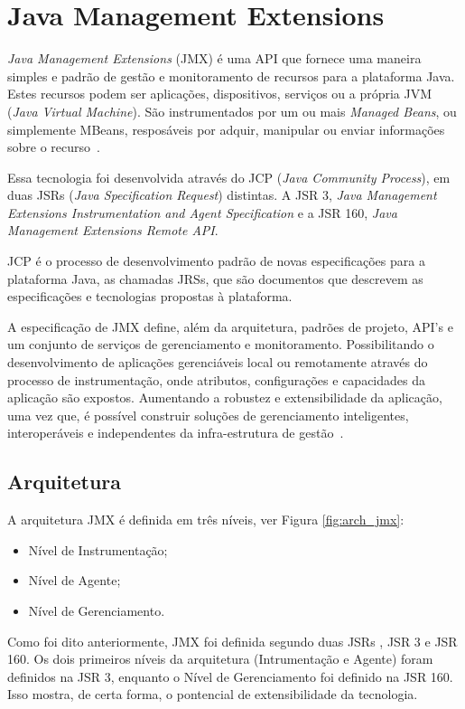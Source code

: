 \chapter{Java Management Extensions}
\label{ch:4}
\textit{Java Management Extensions} (JMX) é uma API que fornece uma maneira simples e padrão de gestão e monitoramento de recursos para a plataforma Java. Estes recursos podem ser aplicações, dispositivos, serviços ou a própria JVM (\textit{Java Virtual Machine}). São instrumentados por um ou mais \textit{Managed Beans}, ou simplemente MBeans, resposáveis por adquir, manipular ou enviar informações sobre o recurso~\cite{lindfors2002jmx}.

Essa tecnologia foi desenvolvida através do JCP (\textit{Java Community Process}), em duas JSRs (\textit{Java Specification Request}) distintas. A JSR 3, \textit{Java Management Extensions Instrumentation and Agent Specification} e a JSR 160, \textit{Java Management Extensions Remote API}.

JCP é o processo de desenvolvimento padrão de novas especificações para a plataforma Java, as chamadas JRSs, que são documentos que descrevem as especificações e tecnologias propostas à plataforma.

A especificação de JMX define, além da arquitetura, padrões de projeto, API's e um conjunto de serviços de gerenciamento e monitoramento. Possibilitando o desenvolvimento de aplicações gerenciáveis local ou remotamente através do processo de instrumentação, onde atributos, configurações e capacidades da aplicação são expostos. Aumentando a robustez e extensibilidade da aplicação, uma vez que, é possível construir soluções de gerenciamento inteligentes, interoperáveis e independentes da infra-estrutura de gestão~\cite{jmx}.
\newpage

\section{Arquitetura}

A arquitetura JMX é definida em três níveis, ver Figura \ref{fig:arch_jmx}:

\begin{itemize}
 \item Nível de Instrumentação;
 \item Nível de Agente;
 \item Nível de Gerenciamento.
\end{itemize}

Como foi dito anteriormente, JMX foi definida segundo duas JSRs , JSR 3 e JSR 160. Os dois primeiros níveis da arquitetura (Intrumentação e Agente) foram definidos na JSR 3, enquanto o Nível de Gerenciamento foi definido na JSR 160. Isso mostra, de certa forma, o pontencial de extensibilidade da tecnologia.
\newline

